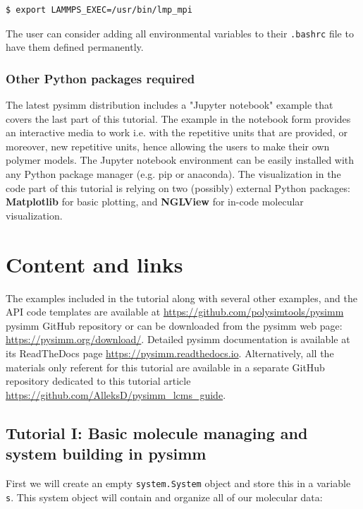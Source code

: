\documentclass[9pt,tutorial]{livecoms}
\newcommand{\githubrepository}{\url{https://github.com/AlleksD/pysimm_lcms_guide}}
\begin{document}
\begin{lstlisting}
$ export LAMMPS_EXEC=/usr/bin/lmp_mpi
\end{lstlisting}
The user can consider adding all environmental variables to their \lstinline$.bashrc$ file to have them defined permanently.


\subsubsection{Other Python packages required}
The latest pysimm distribution includes a "Jupyter notebook" example that covers the last part of this tutorial. The example in the notebook form provides an interactive media to work i.e. with the repetitive units that are provided, or moreover, new repetitive units, hence allowing the users to make their own polymer models. The Jupyter notebook environment can be easily installed with any Python package manager (e.g. pip or anaconda). The visualization in the code part of this tutorial is relying on two (possibly) external Python packages: \textbf{Matplotlib} for basic plotting, and \textbf{NGLView} for in-code molecular visualization.


\section{Content and links}
The examples included in the tutorial along with several other examples, and the API code templates are available at \url{https://github.com/polysimtools/pysimm} pysimm GitHub repository or can be downloaded from the pysimm web page: \url{https://pysimm.org/download/}. 
Detailed pysimm documentation is available at its ReadTheDocs page \url{https://pysimm.readthedocs.io}.
Alternatively, all the materials only referent for this tutorial are available in a separate GitHub repository dedicated to this tutorial article \githubrepository.  


\subsection{Tutorial I: Basic molecule managing and system building in pysimm}

First we will create an empty \lstinline$system.System$ object and store this in a variable \lstinline$s$. This system object will contain and organize all of our molecular data:
\end{document}
